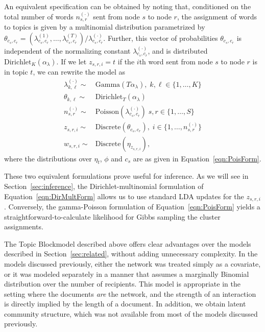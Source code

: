     An equivalent specification can be obtained by noting that, conditioned on the total number of words $n_{s,r}^{(\cdot)}$ sent from node $s$ to node $r$, the assignment of words to topics is given by a multinomial distribution parametrized by
    $ \theta_{c_s,c_r} = \left(\lambda_{c_s,c_r}^{(1)},\dots,  \lambda_{c_s,c_r}^{(T)}\right)/\lambda_{c_s,c_r}^{(\cdot)}$.
    Further, this vector of probabilities $\theta_{c_s,c_r}$ is independent of the normalizing constant $\lambda_{c_s,c_r}^{(\cdot)}$, and is distributed $\mbox{Dirichlet}_K(\alpha_\lambda)$. If we let $z_{s,r,i} =t$ if the $i$th word sent from node $s$ to node $r$ is in topic $t$, we can rewrite the model as
    \begin{equation}
      \begin{aligned}
        \lambda^{(\cdot)}_{k,\ell}\sim& \mbox{Gamma}(T\alpha_\lambda),\; k,\ell\in\{1,\dots, K\}\\
        \theta_{k,\ell} \sim& \mbox{Dirichlet}_T(\alpha_\lambda)\\
        n_{s,r}^{(\cdot)}\sim& \mbox{Poisson}(\lambda_{c_s,c_r}^{(\cdot)})\; s,r\in\{1,\dots, S\}\\
        z_{s,r,i} \sim& \mbox{Discrete}(\theta_{c_s,c_r}),\; i\in\{1,\dots, n_{s,r}^{(\cdot)}\}\\
        w_{s,r,i} \sim& \mbox{Discrete}(\eta_{z_{s,r,i}}),
      \end{aligned}\label{eqn:DirMultForm}
    \end{equation}
    where the distributions over $\eta_t$, $\phi$ and $c_s$ are as given in Equation~\ref{eqn:PoisForm}.
    
    These two equivalent formulations prove useful for inference. As we will see in Section~\ref{sec:inference}, the Dirichlet-multinomial formulation of Equation~\ref{eqn:DirMultForm} allows us to use standard LDA updates for the $z_{s,r,i}$. Conversely, the gamma-Poisson formulation of Equation~\ref{eqn:PoisForm} yields a straightforward-to-calculate likelihood for Gibbs sampling the cluster assignments. 
    
    The Topic Blockmodel described above offers clear advantages over the models described in Section~\ref{sec:related}, without adding unnecessary complexity. In the models discussed previously, either the network was treated simply as a covariate, or it was modeled separately in a manner that assumes a marginally Binomial distribution over the number of recipients. This model is appropriate in the setting where the documents \textit{are} the network, and the strength of an interaction is directly implied by the length of a document. In addition, we obtain latent community structure, which was not available from most of the models discussed previously.

